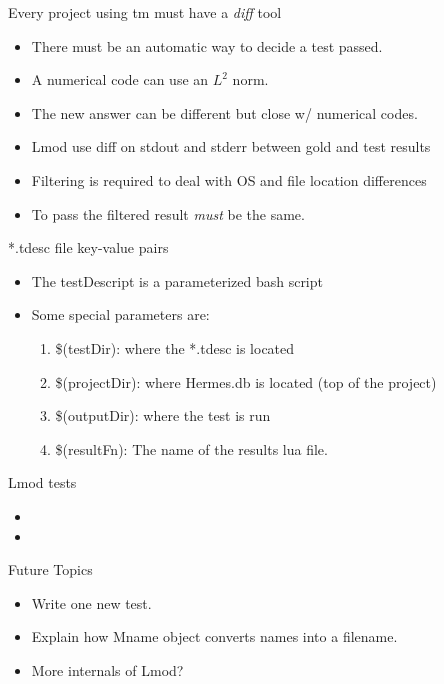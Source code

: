 \documentclass{beamer}
\begin{document}
\begin{frame}{Every project using tm must have a \emph{diff} tool}
  \begin{itemize}
    \item There must be an automatic way to decide a test passed.
    \item A numerical code can use an $L^2$ norm. 
    \item The new answer can be different but close w/ numerical codes.
    \item Lmod use diff on stdout and stderr between gold and test
      results
    \item Filtering is required to deal with OS and file location
      differences
    \item To pass the filtered result {\color{blue} \emph{must}} be
      the same.
  \end{itemize}
\end{frame}

\begin{frame}{*.tdesc file key-value pairs}
  \begin{itemize}
    \item The testDescript is a parameterized bash script
    \item Some special parameters are:
      \begin{enumerate}
        \item \$(testDir): where the *.tdesc is located
        \item \$(projectDir): where Hermes.db is located (top of the
          project)
        \item \$(outputDir): where the test is run
        \item \$(resultFn): The name of the results lua file.
      \end{enumerate}
  \end{itemize}
\end{frame}



\begin{frame}{Lmod tests}
  \begin{itemize}
    \item 
    \item 
  \end{itemize}
\end{frame}




\begin{frame}{Future Topics}
  \begin{itemize}
    \item Write one new test.
    \item Explain how Mname object converts names into a filename.
    \item More internals of Lmod?
  \end{itemize}
\end{frame}
\end{document}
